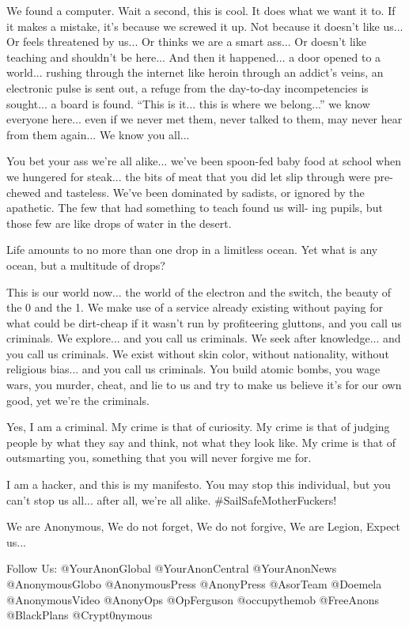 \documentclass[letterpaper,12pt,english]{sphinxmanual}
\begin{document}
We found a computer. Wait a second, this is
cool. It does what we want it to. If it makes a mistake,
it's because we screwed it up. Not because it doesn't like us...
Or feels threatened by us...
Or thinks we are a smart ass...
Or doesn't like teaching and shouldn't be here...
And then it happened... a door opened to a world... rushing through
the internet like heroin through an addict's veins, an electronic pulse is
sent out, a refuge from the day-to-day incompetencies is sought... a board is
found.
``This is it... this is where we belong...''
we know everyone here... even if we never met them, never talked to
them, may never hear from them again... We know you all...

You bet your ass we're all alike... we've been spoon-fed baby food at
school when we hungered for steak... the bits of meat that you did let slip
through were pre-chewed and tasteless. We've been dominated by sadists, or
ignored by the apathetic. The few that had something to teach found us will-
ing pupils, but those few are like drops of water in the desert.

Life amounts to no more than one drop in a limitless ocean.
Yet what is any ocean,
but a multitude of drops?

This is our world now... the world of the electron and the switch, the
beauty of the 0 and the 1. We make use of a service already existing without paying
for what could be dirt-cheap if it wasn't run by profiteering gluttons, and
you call us criminals. We explore... and you call us criminals. We seek
after knowledge... and you call us criminals. We exist without skin color,
without nationality, without religious bias... and you call us criminals.
You build atomic bombs, you wage wars, you murder, cheat, and lie to us
and try to make us believe it's for our own good, yet we're the criminals.

Yes, I am a criminal. My crime is that of curiosity. My crime is
that of judging people by what they say and think, not what they look like.
My crime is that of outsmarting you, something that you will never forgive me
for.

I am a hacker, and this is my manifesto. You may stop this individual,
but you can't stop us all... after all, we're all alike.
\#SailSafeMotherFuckers!

We are Anonymous,
We do not forget,
We do not forgive,
We are Legion,
Expect us...

Follow Us: @YourAnonGlobal @YourAnonCentral @YourAnonNews @AnonymousGlobo @AnonymousPress @AnonyPress @AsorTeam @Doemela @AnonymousVideo
@AnonyOps @OpFerguson @occupythemob @FreeAnons @BlackPlans @Crypt0nymous
\end{document}

